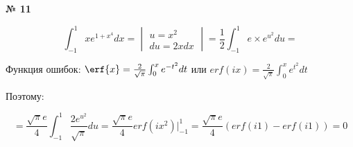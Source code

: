 \documentclass{article}
\begin{document}
\textbf{№ 11} 

\begingroup

\Large

$$ \int_{-1}^{1} xe^{1+x^4}dx 
= \begin{vmatrix} u = x^2 \\ 
                 du = 2xdx \end{vmatrix}
= \frac{1}{2} \int_{-1}^{1} e \times e^{u^2}du 
= $$

Функция ошибок: $ \erf{x} = \frac{2}{\sqrt{\pi}} \int_{0}^{x} e^{-t^{2}} dt $ или $ erf(ix) = \frac{2}{\sqrt{\pi}} \int_{0}^{x} e^{t^{2}} dt $

Поэтому:

$$ = \frac{\sqrt{\pi}e}{4} \int_{-1}^{1}\frac{2e^{u^2}}{\sqrt{\pi}} du 
= \frac{\sqrt{\pi}e}{4} erf(ix^2) \bigg\vert_{-1}^{1}
= \frac{\sqrt{\pi}e}{4} (erf(i1) - erf(i1))
= 0$$

\endgroup
\end{document}
